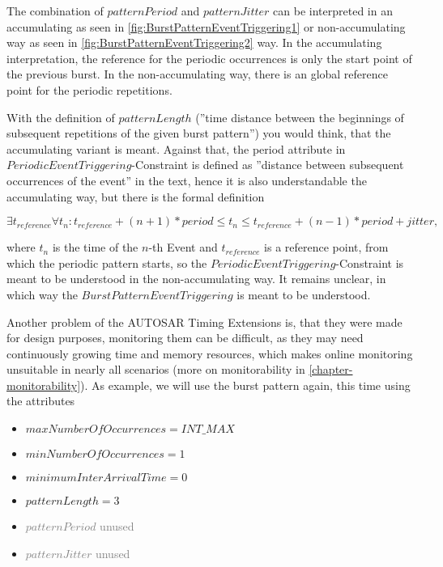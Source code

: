 The combination of $patternPeriod$ and $patternJitter$ can be interpreted in an accumulating as seen in \ref{fig:BurstPatternEventTriggering1} or non-accumulating way as seen in \ref{fig:BurstPatternEventTriggering2} way. In the accumulating interpretation, the reference for the periodic occurrences is only the start point of the previous burst. In the non-accumulating way, there is an global reference point for the periodic repetitions.

With the definition of $patternLength$ (''time distance between the beginnings of subsequent repetitions of the given burst pattern'') you would think, that the accumulating variant is meant. Against that, the period attribute in $PeriodicEventTriggering$-Constraint is defined as ''distance between subsequent occurrences of the event'' in the text, hence it is also understandable the accumulating way, but there is the formal definition

\begin{math}
\exists t_{reference}\forall t_n: t_{reference}+(n+1)*period\leq t_n\leq t_{reference}+(n-1)*period+jitter,
\end{math}

where $t_n$ is the time of the $n$-th Event and $t_{reference}$ is a reference point, from which the periodic pattern starts, so the $PeriodicEventTriggering$-Constraint is meant to be understood in the non-accumulating way. It remains unclear, in which way the $BurstPatternEventTriggering$ is meant to be understood.

Another problem of the AUTOSAR Timing Extensions is, that they were made for design purposes, monitoring them can be difficult, as they may need continuously growing time and memory resources, which makes online monitoring unsuitable in nearly all scenarios (more on monitorability in \ref{chapter-monitorability}). As example, we will use the burst pattern again, this time using the attributes
\begin{itemize}
	\item
	$maxNumberOfOccurrences = INT\_MAX$
	\item
	$minNumberOfOccurrences = 1$
	\item
	$minimumInterArrivalTime = 0$
	\item
	$patternLength = 3$
	\item
	\textcolor{gray}{$patternPeriod$} \textcolor{gray}{unused}
	\item
	\textcolor{gray}{$patternJitter$} \textcolor{gray}{unused}
\end{itemize}

